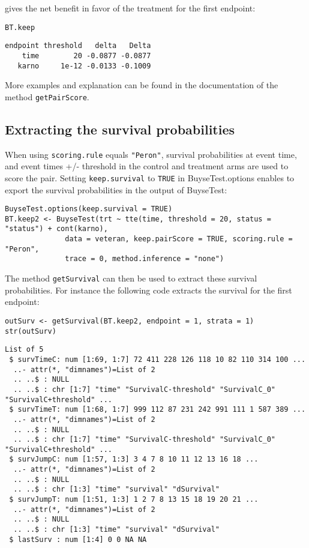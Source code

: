 \documentclass[12pt]{article}
\begin{document}
gives the net benefit in favor of the treatment for the first
endpoint:
\lstset{language=r,label= ,caption= ,captionpos=b,numbers=none}
\begin{lstlisting}
BT.keep
\end{lstlisting}

\begin{verbatim}
endpoint threshold   delta   Delta
    time        20 -0.0877 -0.0877
   karno     1e-12 -0.0133 -0.1009
\end{verbatim}

More examples and explanation can be found in the documentation of
the method \texttt{getPairScore}.

\subsection{Extracting the survival probabilities}
\label{sec:orgdc5e581}
When using \texttt{scoring.rule} equals \texttt{"Peron"}, survival probabilities at
event time, and event times +/- threshold in the control and treatment
arms are used to score the pair. Setting \texttt{keep.survival} to \texttt{TRUE} in
BuyseTest.options enables to export the survival probabilities in the
output of BuyseTest:
\lstset{language=r,label= ,caption= ,captionpos=b,numbers=none}
\begin{lstlisting}
BuyseTest.options(keep.survival = TRUE)
BT.keep2 <- BuyseTest(trt ~ tte(time, threshold = 20, status = "status") + cont(karno),
		      data = veteran, keep.pairScore = TRUE, scoring.rule = "Peron",
		      trace = 0, method.inference = "none")
\end{lstlisting}

The method \texttt{getSurvival} can then be used to extract these survival
probabilities. For instance the following code extracts the survival
for the first endpoint:
\lstset{language=r,label= ,caption= ,captionpos=b,numbers=none}
\begin{lstlisting}
outSurv <- getSurvival(BT.keep2, endpoint = 1, strata = 1)
str(outSurv)
\end{lstlisting}

\begin{verbatim}
List of 5
 $ survTimeC: num [1:69, 1:7] 72 411 228 126 118 10 82 110 314 100 ...
  ..- attr(*, "dimnames")=List of 2
  .. ..$ : NULL
  .. ..$ : chr [1:7] "time" "SurvivalC-threshold" "SurvivalC_0" "SurvivalC+threshold" ...
 $ survTimeT: num [1:68, 1:7] 999 112 87 231 242 991 111 1 587 389 ...
  ..- attr(*, "dimnames")=List of 2
  .. ..$ : NULL
  .. ..$ : chr [1:7] "time" "SurvivalC-threshold" "SurvivalC_0" "SurvivalC+threshold" ...
 $ survJumpC: num [1:57, 1:3] 3 4 7 8 10 11 12 13 16 18 ...
  ..- attr(*, "dimnames")=List of 2
  .. ..$ : NULL
  .. ..$ : chr [1:3] "time" "survival" "dSurvival"
 $ survJumpT: num [1:51, 1:3] 1 2 7 8 13 15 18 19 20 21 ...
  ..- attr(*, "dimnames")=List of 2
  .. ..$ : NULL
  .. ..$ : chr [1:3] "time" "survival" "dSurvival"
 $ lastSurv : num [1:4] 0 0 NA NA
\end{verbatim}
\end{document}
